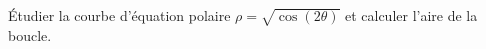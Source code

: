 \begin{enonce}
\begin{exercise}[ID={RMS119/688 Mines-Ponts PSI},subtitle={},tags={}, difficulty={0}]
Étudier la courbe d'équation polaire $\rho=\sqrt{\cos(2\theta)}$ et calculer l'aire de la boucle.
\end{exercise}
\begin{solution}
\end{solution}
\end{enonce}
